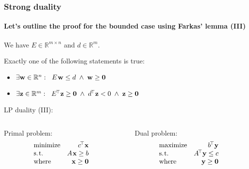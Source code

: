 \documentclass{beamer}
\renewcommand{\.}{\hskip .75pt}
\DeclareMathOperator{\aand}{~\wedge~}
\begin{document}
\begin{frame}
	\frametitle{Strong duality}
	\framesubtitle{Let's outline the proof for the bounded case using Farkas' lemma (III)}
	
	We have $E \in \mathbb{R}^{m \times n}$ and $d \in \mathbb{R}^{m}$.
	\smallskip

	Exactly one of the following statements is true:
	\begin{itemize} \color{dblue}
		\item $\exists \bold{w} \in \mathbb{R}^{n} : \ \; E\. \bold{w} \le d \aand \bold{w} \ge \bold{0}$
		\item $\exists \bold{z} \in \mathbb{R}^{m} : \ \; E^{\!\top} \bold{z} \ge \bold{0} \aand d^{\!\top} \bold{z} < 0 \aand \bold{z} \ge \bold{0}$
	\end{itemize}
	\bigskip

	LP duality (III):
	\bigskip

	\begin{columns} 
		\begin{column}{0.5\textwidth}
		\qquad 
		Primal problem:
		$$
		\begin{array}{lrcrcl}
			\text{minimize} & c^{\!\top}\bold{x} \\
			\text{s.\.t.} & A\. \bold{x} \ge b \\
			\text{where} & \bold{x} \ge \bold{0}
		\end{array}
		$$
		\end{column}
		
		\begin{column}{0.5\textwidth}
		\quad~
		Dual problem:
		$$
		\begin{array}{lrcrcl}
			\text{maximize} & b^{\!\top}\bold{y} \\
			\text{s.\.t.} & A^{\!\top} \bold{y} \le c \\
			\text{where} & \bold{y} \ge \bold{0}
		\end{array}
		$$
		\end{column}
	\end{columns}
	
\end{frame}
\end{document}
